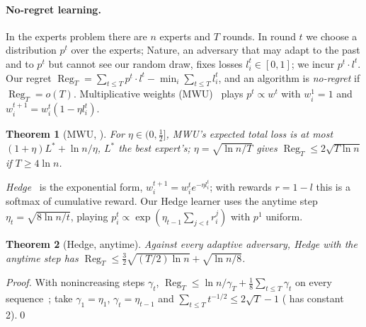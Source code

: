 \documentclass[10pt]{article}
\theoremstyle{tplain}
\newtheorem{theorem}{Theorem}
\theoremstyle{tdef}
\theoremstyle{trem}
\DeclareMathOperator{\Reg}{Reg}
\begin{document}
\paragraph{No-regret learning.} In the experts problem there are $n$ experts and $T$ rounds. In round $t$ we choose a distribution $p^t$ over the experts; Nature, an adversary that may adapt to the past and to $p^t$ but cannot see our random draw, fixes losses $l_i^t\in[0,1]$; we incur $p^t\cdot l^t$. Our regret $\Reg_T=\sum_{t\le T}p^t\cdot l^t-\min_i\sum_{t\le T}l_i^t$, and an algorithm is \emph{no-regret} if $\Reg_T=o(T)$. 
Multiplicative weights (MWU)~\cite{AHK12} plays $p^t\propto w^t$ with $w_i^1=1$ and $w_i^{t+1}=w_i^t(1-\eta l_i^t)$.
\begin{theorem}[MWU, {\cite[Thm.~2.1]{AHK12}}]\label{thm:mwu}
For $\eta\in(0,\frac12]$, MWU's expected total loss is at most $(1+\eta)L^*+\ln n/\eta$, $L^*$ the best expert's; $\eta=\sqrt{\ln n/T}$ gives $\Reg_T\le2\sqrt{T\ln n}$ if $T\ge4\ln n$.
\end{theorem}
\emph{Hedge}~\cite{FS97} is the exponential form, $w_i^{t+1}=w_i^te^{-\eta l_i^t}$; with rewards $r=1-l$ this is a softmax of cumulative reward. Our Hedge learner uses the anytime step $\eta_t=\sqrt{8\ln n/t}$, playing $p_i^t\propto\exp(\eta_{t-1}\sum_{j<t}r_i^j)$ with $p^1$ uniform.
\begin{theorem}[Hedge, anytime]\label{fact:hedge}
Against every adaptive adversary, Hedge with the anytime step has $\Reg_T\le\frac32\sqrt{(T/2)\ln n}+\sqrt{\ln n/8}$.
\end{theorem}
\emph{Proof.} With nonincreasing steps $\gamma_t$, $\Reg_T\le\ln n/\gamma_T+\frac18\sum_{t\le T}\gamma_t$ on every sequence~\cite[Lemmas~1--2, eq.~(6)]{dRvEGK14}; take $\gamma_1=\eta_1$, $\gamma_t=\eta_{t-1}$ and $\sum_{t\le T}t^{-1/2}\le2\sqrt T-1$ (\cite[Thm.~2.3]{CBL06} has constant 2).\qed
\end{document}
